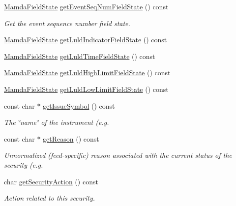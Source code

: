 \begin{CompactItemize}
\hyperlink{namespaceWombat_93aac974f2ab713554fd12a1fa3b7d2a}{Mamda\-Field\-State} \hyperlink{classWombat_1_1MamdaSecStatusListener_6a65bfc69736ed5d4c12e0fe161aff3d}{get\-Event\-Seq\-Num\-Field\-State} () const 
\begin{CompactList}\small\item\em Get the event sequence number field state. \item\end{CompactList}\item 
\hyperlink{namespaceWombat_93aac974f2ab713554fd12a1fa3b7d2a}{Mamda\-Field\-State} \hyperlink{classWombat_1_1MamdaSecStatusListener_1e65d16674a50306ed0c455e9b1c7dcd}{get\-Luld\-Indicator\-Field\-State} () const 
\item 
\hyperlink{namespaceWombat_93aac974f2ab713554fd12a1fa3b7d2a}{Mamda\-Field\-State} \hyperlink{classWombat_1_1MamdaSecStatusListener_fa4c37602326edad8f06d582e7e843a0}{get\-Luld\-Time\-Field\-State} () const 
\item 
\hyperlink{namespaceWombat_93aac974f2ab713554fd12a1fa3b7d2a}{Mamda\-Field\-State} \hyperlink{classWombat_1_1MamdaSecStatusListener_d56a6b2b5df893dd0ffc515ade629a43}{get\-Luld\-High\-Limit\-Field\-State} () const 
\item 
\hyperlink{namespaceWombat_93aac974f2ab713554fd12a1fa3b7d2a}{Mamda\-Field\-State} \hyperlink{classWombat_1_1MamdaSecStatusListener_ec9193e6cfd9d44150815af67ea2fbac}{get\-Luld\-Low\-Limit\-Field\-State} () const 
\item 
const char $\ast$ \hyperlink{classWombat_1_1MamdaSecStatusListener_8d05183ac7dac8914259842d6f860a1b}{get\-Issue\-Symbol} () const 
\begin{CompactList}\small\item\em The \char`\"{}name\char`\"{} of the instrument (e.g. \item\end{CompactList}\item 
const char $\ast$ \hyperlink{classWombat_1_1MamdaSecStatusListener_71962c3d0ecd60a689324e68180b4e35}{get\-Reason} () const 
\begin{CompactList}\small\item\em Unnormalized (feed-specific) reason associated with the current status of the security (e.g. \item\end{CompactList}\item 
char \hyperlink{classWombat_1_1MamdaSecStatusListener_a0180f033edd189426cb0c7386f9fb4b}{get\-Security\-Action} () const 
\begin{CompactList}\small\item\em Action related to this security. \item\end{CompactList}\item 

\end{CompactItemize}
